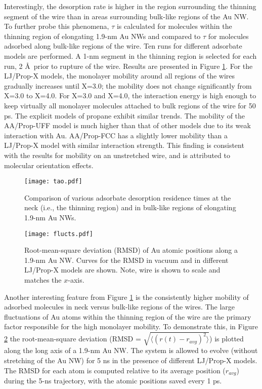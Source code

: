 \documentclass[10pt]{report}  %
\newcommand\findent{\hspace*{\parindent}}
\begin{document}
\findent Interestingly, the desorption rate is higher in the region surrounding the thinning segment of the wire than in areas surrounding bulk-like regions of the Au NW. To further probe this phenomena, $\tau$ is calculated for molecules within the thinning region of elongating 1.9-nm Au NWs and compared to $\tau$ for molecules adsorbed along bulk-like regions of the wire.  Ten runs for different adsorbate models are performed.  A 1-nm segment in the thinning region is selected for each run, 2 \AA\ prior to rupture of the wire.  Results are presented in Figure \ref{fig:tao}.  For the LJ/Prop-X models, the monolayer mobility around all regions of the wires gradually increases until X=3.0; the mobility does not change significantly from X=3.0 to X=4.0.  For X=3.0 and X=4.0, the interaction energy is high enough to keep virtually all monolayer molecules attached to bulk regions of the wire for 50 ps.  The explicit models of propane exhibit similar trends.  The mobility of the AA/Prop-UFF model is much higher than that of other models due to its weak interaction with Au.  AA/Prop-FCC has a slightly lower mobility than a LJ/Prop-X model with similar interaction strength.  This finding is consistent with the results for mobility on an unstretched wire, and is attributed to molecular orientation effects.

%
%
\begin{figure}[]
	\centering
	\texttt{[image: tao.pdf]}
	\caption{ Comparison of various adsorbate desorption residence times at the neck (i.e., the thinning region) and in bulk-like regions of elongating 1.9-nm Au NWs. }
	\label{fig:tao}
\end{figure}

%
%
\begin{figure}[]
	\centering
	\texttt{[image: flucts.pdf]}
	\caption{Root-mean-square deviation (RMSD) of Au atomic positions along a 1.9-nm Au NW.  Curves for the RMSD in vacuum and in different LJ/Prop-X models are shown.  Note, wire is shown to scale and matches the $x$-axis. }
	\label{fig:oscillations}
\end{figure}

Another interesting feature from Figure \ref{fig:tao} is the consistently higher mobility of adsorbed molecules in neck versus bulk-like regions of the wires.  The large fluctuations of Au atoms within the thinning region of the wire are the primary factor responsible for the high monolayer mobility. To demonstrate this, in Figure \ref{fig:oscillations} the root-mean-square deviation (RMSD = $\sqrt{\big\langle(r(t)-r_{avg})^2\big\rangle}$)  is plotted along the long axis of a 1.9-nm Au NW.  The system is allowed to evolve (without stretching of the Au NW) for 5 ns in the presence of different LJ/Prop-X models.  The RMSD for each atom is computed relative to its average position ($r_{avg}$) during the 5-ns trajectory, with the atomic positions saved every 1 ps.   
\end{document}
